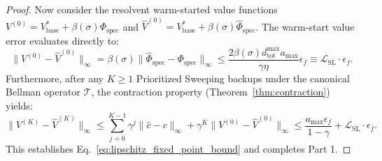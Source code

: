 \documentclass[11pt,a4paper]{article}
\begin{document}
\begin{proof}
Now consider the resolvent warm-started value functions $V^{(0)} = V_{\text{base}}^* + \beta(\sigma) \Phi_{\text{spec}}$ and $\hat{V}^{(0)} = V_{\text{base}}^* + \beta(\sigma) \hat{\Phi}_{\text{spec}}$. The warm-start value error evaluates directly to:
\begin{equation}
\label{eq:operator_perturbation_bound}
\|V^{(0)} - \hat{V}^{(0)}\|_\infty = \beta(\sigma) \|\hat{\Phi}_{\text{spec}} - \Phi_{\text{spec}}\|_\infty \le \frac{2 \beta(\sigma) d_{\text{tot}}^{\max} a_{\max}}{\gamma \eta} \epsilon_f \equiv \mathcal{L}_{\text{SL}} \cdot \epsilon_f.
\end{equation}
Furthermore, after any $K \ge 1$ Prioritized Sweeping backups under the canonical Bellman operator $\mathcal{T}$, the contraction property (Theorem~\ref{thm:contraction}) yields:
\begin{equation}
\|V^{(K)} - \hat{V}^{(K)}\|_\infty \le \sum_{j=0}^{K-1} \gamma^j \|\hat{c} - c\|_\infty + \gamma^K \|V^{(0)} - \hat{V}^{(0)}\|_\infty \le \frac{a_{\max} \epsilon_f}{1 - \gamma} + \mathcal{L}_{\text{SL}} \cdot \epsilon_f.
\end{equation}
This establishes Eq.~\eqref{eq:lipschitz_fixed_point_bound} and completes Part 1.


\end{proof}
\end{document}
